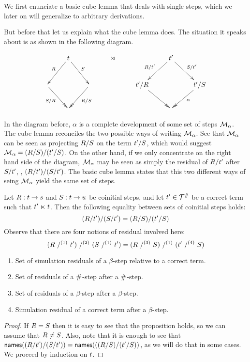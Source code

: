 We first enunciate a basic cube lemma that deals with single steps,
which we later on will generalize to arbitrary derivations.

But before that let us explain what the cube lemma does.
The situation it speaks about is as shown in the following diagram.

\[
\xymatrix{
  & \tm
  \ar[dl]_{\redex} \ar[dr]^{\redextwo}
  &
  & \refinedby
  &
  & \tm'
  \ar[dl]_{\redex / \tm'} \ar[dr]^{\redextwo / \tm'}
  &
  \\
  \ar@{->>}[dr]_{\redextwo / \redex}
  &
  &
  \ar@{->>}[dl]^{\redex / \redextwo}
  &
  &
  \tm' / \redex
  \ar@{->>}[dr]
  &
  &
  \tm' / \redextwo
  \ar@{->>}[dl]^{\alpha}
  \\
  &
  &
  &
  &
  &
  &
  \\
}
\]

In the diagram before, $\alpha$ is a complete development of some set of steps
$\mathcal{M}_\alpha$.
The cube lemma reconciles the two possible ways of writing $\mathcal{M}_\alpha$.
See that $\mathcal{M}_\alpha$ can be seen as projecting $R / S$
on the term $t' / S$, which would suggest
$\mathcal{M}_\alpha = (R / S) / (t' / S)$.
On the other hand, if we only concentrate on the right hand side of the
diagram, $\mathcal{M}_\alpha$ may be seen as simply the residual of $R / t'$
after $S / t'$, \ie, $(R / t') / (S / t')$.
The basic cube lemma states that this two different ways of seing $\mathcal{M}_\alpha$
yield the same set of steps.

\begin{lemma}
Let $R : t \to s$ and $S : t \to u$ be coinitial steps,
and let $t' \in \mathcal{T}^{\mathtt{\#}}$ be a correct term such that $t' \mathrel{\ltimes} t$.
Then the following equality between sets of coinitial steps holds:
\[
  (R/t')/(S/t') = (R/S)/(t'/S)
\]
Observe that there are four notions of residual involved here:
\[
  (\redex\ /^{(1)}\ \tm')\ /^{(2)}\ (\redextwo\ /^{(1)}\ \tm') = (\redex\ /^{(3)}\ \redextwo)\ /^{(1)}\ (\tm'\ /^{(4)}\ \redextwo)
\]
\begin{enumerate}
\item Set of simulation residuals of a $\beta$-step relative to a correct term.
\item Set of residuals of a $\mathtt{\#}$-step after a $\mathtt{\#}$-step.
\item Set of residuals of a $\beta$-step after a $\beta$-step.
\item Simulation residual of a correct term after a $\beta$-step.
\end{enumerate}
\end{lemma}
\begin{proof}
If $R = S$ then it is easy to see that the proposition holds, so we can assume that $R \neq S$.
  Also, note that it is enough to see that $\mathsf{names}((R/t')/(S/t')) = \mathsf{names}(((R/S)/(t'/S))$, as we will do that in some cases.
We proceed by induction on $t$.
\end{proof}

